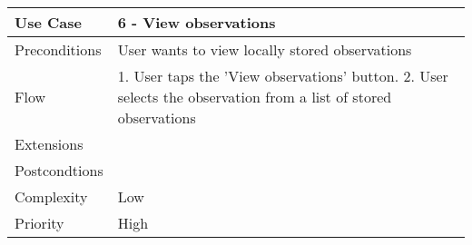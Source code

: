 \begin{tabular}[t]{|l|l|}\hline
Use Case&6 - View observations\\\hline
Preconditions&User wants to view locally stored observations\\\hline
Flow&1. User taps the 'View observations' button.
2. User selects the observation from a list of stored observations \\\hline
Extensions& \\\hline
Postcondtions&\\\hline
Complexity&Low\\\hline
Priority&High\\\hline
\end{tabular}